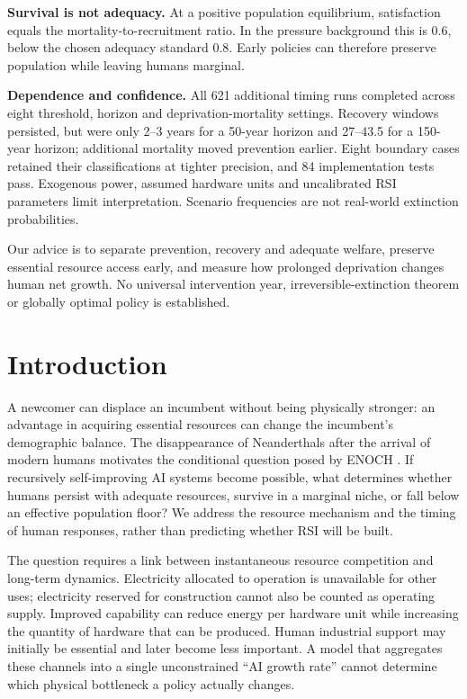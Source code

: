 \documentclass[12pt,a4paper]{article}
\theoremstyle{remark}
\begin{document}
\textbf{Survival is not adequacy.} At a positive population equilibrium, satisfaction equals the mortality-to-recruitment ratio. In the pressure background this is 0.6, below the chosen adequacy standard 0.8. Early policies can therefore preserve population while leaving humans marginal.

\textbf{Dependence and confidence.} All 621 additional timing runs completed across eight threshold, horizon and deprivation-mortality settings. Recovery windows persisted, but were only 2--3 years for a 50-year horizon and 27--43.5 for a 150-year horizon; additional mortality moved prevention earlier. Eight boundary cases retained their classifications at tighter precision, and 84 implementation tests pass. Exogenous power, assumed hardware units and uncalibrated RSI parameters limit interpretation. Scenario frequencies are not real-world extinction probabilities.

Our advice is to separate prevention, recovery and adequate welfare, preserve essential resource access early, and measure how prolonged deprivation changes human net growth. No universal intervention year, irreversible-extinction theorem or globally optimal policy is established.

\clearpage
\pagestyle{fancy}
\setcounter{page}{1}
\tableofcontents
\clearpage

\section{Introduction}\label{sec:intro}
A newcomer can displace an incumbent without being physically stronger: an advantage in acquiring essential resources can change the incumbent's demographic balance. The disappearance of Neanderthals after the arrival of modern humans motivates the conditional question posed by ENOCH \cite{problem}. If recursively self-improving AI systems become possible, what determines whether humans persist with adequate resources, survive in a marginal niche, or fall below an effective population floor? We address the resource mechanism and the timing of human responses, rather than predicting whether RSI will be built.

The question requires a link between instantaneous resource competition and long-term dynamics. Electricity allocated to operation is unavailable for other uses; electricity reserved for construction cannot also be counted as operating supply. Improved capability can reduce energy per hardware unit while increasing the quantity of hardware that can be produced. Human industrial support may initially be essential and later become less important. A model that aggregates these channels into a single unconstrained ``AI growth rate'' cannot determine which physical bottleneck a policy actually changes.
\end{document}
